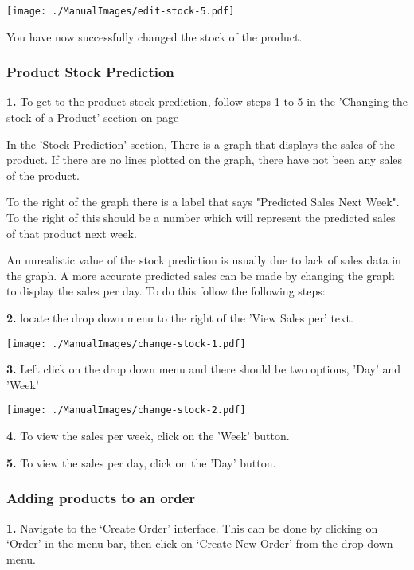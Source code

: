 \texttt{[image: ./ManualImages/edit-stock-5.pdf]}

You have now successfully changed the stock of the product.


\pagebreak
\subsubsection{Product Stock Prediction}
\label{fig:Product Stock Prediction}

\textbf{1.} To get to the product stock prediction, follow steps 1 to 5 in the 'Changing the stock of a Product' section on page \pageref{fig:Changing the stock of a Product}

In the 'Stock Prediction' section, There is a graph that displays the sales of the product. If there are no lines plotted on the graph, there have not been any sales of the product.

To the right of the graph there is a label that says "Predicted Sales Next Week". To the right of this should be a number which will represent the predicted sales of that product next week.

An unrealistic value of the stock prediction is usually due to lack of sales data in the graph. A more accurate predicted sales can be made by changing the graph to display the sales per day. To do this follow the following steps:

\textbf{2.} locate the drop down menu to the right of the 'View Sales per' text.

\texttt{[image: ./ManualImages/change-stock-1.pdf]}

\textbf{3.} Left click on the drop down menu and there should be two options, 'Day' and 'Week'

\texttt{[image: ./ManualImages/change-stock-2.pdf]}

\textbf{4.} To view the sales per week, click on the 'Week' button.

\textbf{5.} To view the sales per day, click on the 'Day' button.

\pagebreak
\subsubsection{Adding products to an order}
\label{fig:Adding products to an order}

\textbf{1.} Navigate to the `Create Order' interface. This can be done by clicking on `Order' in the menu bar, then click on `Create New Order' from the drop down menu.

